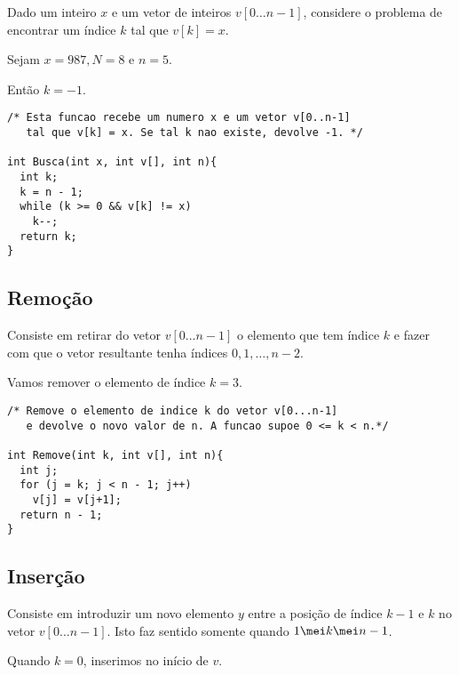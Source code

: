 \documentclass[a4paper]{memoir}
\newcommand{\nv}{0 \ldots n-1}
\begin{document}
Dado um inteiro $x$ e um vetor de inteiros $v[\nv]$, considere o problema de encontrar um índice $k$ tal que $v[k] = x$.

\begin{ex}
Sejam $x = 987, N = 8$ e $n = 5$.


Então $k = -1$.

\newpage

\begin{verbatim}
/* Esta funcao recebe um numero x e um vetor v[0..n-1]
   tal que v[k] = x. Se tal k nao existe, devolve -1. */

int Busca(int x, int v[], int n){
  int k;
  k = n - 1;
  while (k >= 0 && v[k] != x)
    k--;
  return k;
}
\end{verbatim}

\end{ex}

\subsection{Remoção}

Consiste em retirar do vetor $v[\nv]$ o elemento que tem índice $k$ e fazer com que o vetor resultante tenha índices $0,1,\ldots,n-2$.

\begin{ex}
Vamos remover o elemento de índice $k = 3$.


\begin{verbatim}
/* Remove o elemento de indice k do vetor v[0...n-1]
   e devolve o novo valor de n. A funcao supoe 0 <= k < n.*/

int Remove(int k, int v[], int n){
  int j;
  for (j = k; j < n - 1; j++)
    v[j] = v[j+1];
  return n - 1;
}
\end{verbatim}

\end{ex}

\subsection{Inserção}

Consiste em introduzir um novo elemento $y$ entre a posição de índice $k-1$ e $k$ no vetor $v[\nv]$. Isto faz sentido somente quando $1 \mei k \mei n - 1$.

Quando $k = 0$, inserimos no início de $v$.
\end{document}
